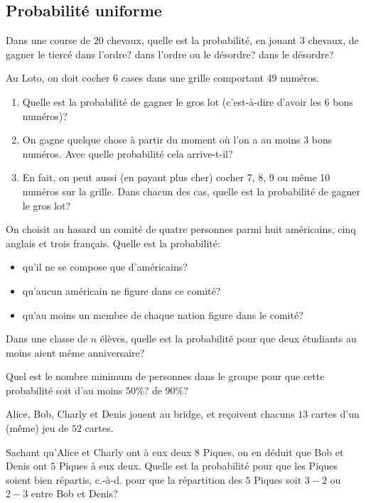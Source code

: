 \documentclass{book}
\begin{document}
\subsection*{Probabilité uniforme}
\begin{Exercice}
Dans une course de $20$ chevaux, quelle est la probabilité, en jouant
$3$ chevaux, de gagner le tiercé dans l'ordre?
dans l'ordre ou le désordre?
dans le désordre?
\end{Exercice}
\begin{Exercice}[Loto]
Au Loto, on doit cocher 6 cases dans une grille comportant 49 numéros.
\begin{enumerate}
\item
  Quelle est la probabilité de gagner le gros lot (c'est-à-dire d'avoir les 6 bons numéros)?
\item
  On gagne quelque chose à partir du moment où l'on a au moins 3 bons numéros.
  Avec quelle probabilité cela arrive-t-il?
\item
  En fait, on peut aussi (en payant plus cher) cocher 7, 8, 9 ou même 10 numéros
  sur la grille. Dans chacun des cas, quelle est la probabilité de gagner le
  gros lot?
\end{enumerate}
\end{Exercice}
\begin{Exercice}[Comité]
On choisit au hasard un comité de quatre personnes parmi huit américains, cinq anglais et trois français. Quelle est la probabilité:
\begin{itemize}
\item
  qu'il ne se compose que d'américains?
\item
  qu'aucun américain ne figure dans ce comité?
\item
  qu'au moins un membre de chaque nation figure dans le comité?
\end{itemize}
\end{Exercice}
\begin{Exercice}

Dans une classe de $n$ élèves, quelle est la probabilité pour que
deux étudiants au moins aient même anniversaire?

Quel est le nombre minimum de personnes dans le groupe pour que
cette probabilité soit d'au moins $50\%$? de $90\%$?
\end{Exercice}
\begin{Exercice}[Bridge]
Alice, Bob, Charly et Denis jouent au bridge, et
reçoivent chacuns $13$ cartes d'un (même) jeu de $52$ cartes.

Sachant qu'Alice et Charly ont à eux deux $8$ Piques,
on en déduit que Bob et Denis ont $5$ Piques à eux deux.
Quelle est la probabilité pour que les Piques soient \og{}bien répartis\fg{},
c.-à-d. pour que la répartition des $5$ Piques soit $3-2$ ou $2-3$ entre Bob et Denis?
\end{Exercice}
\end{document}
